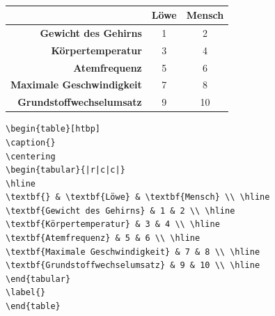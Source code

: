 \documentclass["WS\space 16-17\space -\space LaTeX-Kurs\space -\space Praesentation\space -\space 2.tex"]{subfiles}
\begin{document}
\begin{frame}[fragile]
	\begin{outputbox}
		\vspace{-0.8cm}
		\begin{center}
\begin{table}[htbp] 
	\caption{}
	\centering
\begin{tabular}{|r|c|c|}
	\hline 
	\textbf{} & \textbf{Löwe} & \textbf{Mensch} \\ \hline 
	\textbf{Gewicht des Gehirns} & 1 & 2 \\ \hline 
	\textbf{Körpertemperatur} & 3 & 4 \\ \hline 
	\textbf{Atemfrequenz} & 5 & 6 \\ \hline 
	\textbf{Maximale Geschwindigkeit} & 7 & 8 \\ \hline 
	\textbf{Grundstoffwechselumsatz} & 9 & 10 \\ \hline
\end{tabular} 
\label{}
\end{table}

		\end{center}
		
	\end{outputbox}
	\vspace{-0.4cm}
	\begin{lstlisting}
\begin{table}[htbp]
\caption{}
\centering
\begin{tabular}{|r|c|c|}
\hline 
\textbf{} & \textbf{Löwe} & \textbf{Mensch} \\ \hline 
\textbf{Gewicht des Gehirns} & 1 & 2 \\ \hline 
\textbf{Körpertemperatur} & 3 & 4 \\ \hline 
\textbf{Atemfrequenz} & 5 & 6 \\ \hline 
\textbf{Maximale Geschwindigkeit} & 7 & 8 \\ \hline 
\textbf{Grundstoffwechselumsatz} & 9 & 10 \\ \hline
\end{tabular} 
\label{}
\end{table}
	\end{lstlisting}
\end{frame}
\end{document}
